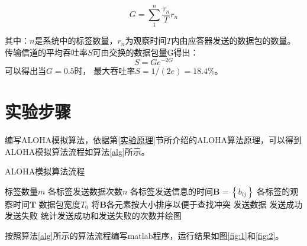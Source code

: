 \documentclass[a4paper]{ctexart}
\begin{document}
$$G=\sum_{1}^{n}\frac{\tau_n}{T}r_n$$

其中：$n$是系统中的标签数量，$r_n$为观察时间$T$内由应答器发送的数据包的数量。
传输信道的平均吞吐率$S$可由交换的数据包量G得出：
$$S=Ge^{-2G}$$
可以得出当$G=0.5$时， 最大吞吐率$S=1/(2e)=18.4\%$。

\section{实验步骤}
编写ALOHA模拟算法，依据第\ref{实验原理}节所介绍的ALOHA算法原理，可以得到ALOHA模拟算法流程如算法\ref{alg}所示。

\begin{algorithm}
	\caption{ALOHA模拟算法流程}
	\label{alg}
	\begin{algorithmic}[1]
		\Require 标签数量$m$
		\Require 各标签发送数据次数$n$
		\Require 各标签发送信息的时间$\bm B=\left\{b_{ij}\right\}$
		\Require 各标签的观察时间$\bm T$
		\Require 数据包宽度$T_0$
		\State 将$\bm B$各元素按大小排序以便于查找冲突
		\State 发送数据
		\State 发送成功
		\Else 
		\State 发送失败
		\EndIf
		\EndIf
		\EndFor
		\Ensure 统计发送成功和发送失败的次数并绘图
	\end{algorithmic}
\end{algorithm}

按照算法\ref{alg}所示的算法流程编写matlab程序，运行结果如图\ref{fig:1}和\ref{fig:2}。
\end{document}
